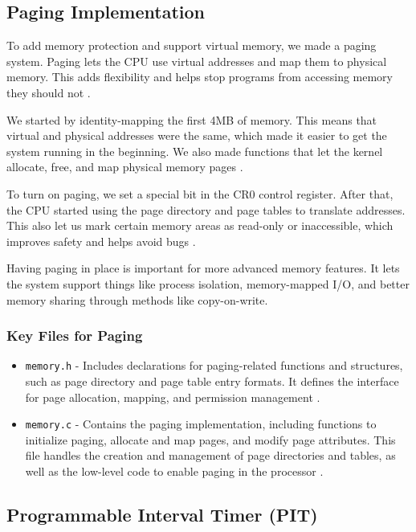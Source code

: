 \documentclass[a4paper,11pt]{article}
\begin{document}
\subsection{Paging Implementation}

To add memory protection and support virtual memory, we made a paging system. Paging lets the CPU use virtual addresses and map them to physical memory. This adds flexibility and helps stop programs from accessing memory they should not \cite{OSDev_Paging}.

We started by identity-mapping the first 4MB of memory. This means that virtual and physical addresses were the same, which made it easier to get the system running in the beginning. We also made functions that let the kernel allocate, free, and map physical memory pages \cite{OSDev_Paging}.

To turn on paging, we set a special bit in the CR0 control register. After that, the CPU started using the page directory and page tables to translate addresses. This also let us mark certain memory areas as read-only or inaccessible, which improves safety and helps avoid bugs \cite{OSDev_Paging}.

Having paging in place is important for more advanced memory features. It lets the system support things like process isolation, memory-mapped I/O, and better memory sharing through methods like copy-on-write. 



\subsubsection{Key Files for Paging}
\begin{itemize}
    \item \texttt{memory.h} - Includes declarations for paging-related functions and structures, such as page directory and page table entry formats. It defines the interface for page allocation, mapping, and permission management \cite{OSDev_Paging}.
    
    \item \texttt{memory.c} - Contains the paging implementation, including functions to initialize paging, allocate and map pages, and modify page attributes. This file handles the creation and management of page directories and tables, as well as the low-level code to enable paging in the processor \cite{OSDev_Paging}.
\end{itemize}

\subsection{Programmable Interval Timer (PIT)}
\end{document}

